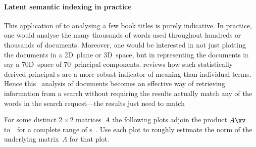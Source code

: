 \paragraph{Latent semantic indexing in practice}
This application of  to analysing a few book titles is purely indicative.
In practice, one would analyse the many thousands of words used throughout hundreds or thousands of documents. 
Moreover, one would be interested in not just plotting the documents in a 2D~plane or 3D~space, but in representing the documents in say a 70D~space of \(70\)~principal components.
\cite{Berry95} reviews how such statistically derived principal s are a more robust indicator of meaning than individual terms.  
Hence this \svd\ analysis of documents becomes an effective way of retrieving information from a search without requiring the results actually match any of the words in the search request---the results just need to match 
















\sectionExercises


\begin{exercise}  
For some distinct \(2\times2\) matrices~\(A\) the following plots adjoin the product \(A\xv\) to~\xv\ for a complete range of s~\xv.
Use each plot to roughly estimate the norm of the underlying matrix~\(A\) for that plot.
\begin{Parts}
\item {}
\item {}
\item {}
\item {}
\begin{OmitV1}
\item {}
\item {}
\end{OmitV1}
\end{Parts}
\end{exercise}


